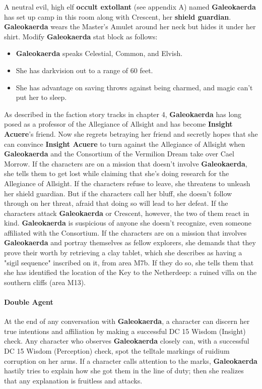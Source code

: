 \documentclass[10pt,a4,twoside,twocolumn,openany,nodeprecatedcode]{dndbook}
\begin{document}
A neutral evil, high elf \textbf{occult extollant} (see appendix A) named \textbf{Galeokaerda} has set up camp in this room along with Crescent, her \textbf{shield guardian}. \textbf{Galeokaerda} wears the Master's Amulet around her neck but hides it under her shirt.
Modify \textbf{Galeokaerda} stat block as follows:
\begin{itemize}

\item \textbf{Galeokaerda} speaks Celestial, Common, and Elvish.
\item She has darkvision out to a range of 60 feet.
\item She has advantage on saving throws against being charmed, and magic can't put her to sleep.
\end{itemize}


As described in the faction story tracks in chapter 4, \textbf{Galeokaerda} has long posed as a professor of the Allegiance of Allsight and has become \textbf{Insight Acuere}'s friend. Now she regrets betraying her friend and secretly hopes that she can convince \textbf{Insight Acuere} to turn against the Allegiance of Allsight when \textbf{Galeokaerda} and the Consortium of the Vermilion Dream take over Cael Morrow.
If the characters are on a mission that doesn't involve \textbf{Galeokaerda}, she tells them to get lost while claiming that she's doing research for the Allegiance of Allsight. If the characters refuse to leave, she threatens to unleash her shield guardian. But if the characters call her bluff, she doesn't follow through on her threat, afraid that doing so will lead to her defeat. If the characters attack \textbf{Galeokaerda} or Crescent, however, the two of them react in kind.
\textbf{Galeokaerda} is suspicious of anyone she doesn't recognize, even someone affiliated with the Consortium. If the characters are on a mission that involves \textbf{Galeokaerda} and portray themselves as fellow explorers, she demands that they prove their worth by retrieving a clay tablet, which she describes as having a "sigil sequence" inscribed on it, from area M7b. If they do so, she tells them that she has identified the location of the Key to the Netherdeep: a ruined villa on the southern cliffs (area M13).
\paragraph{Double Agent}
At the end of any conversation with \textbf{Galeokaerda}, a character can discern her true intentions and affiliation by making a successful DC 15 Wisdom (Insight) check. Any character who observes \textbf{Galeokaerda} closely can, with a successful DC 15 Wisdom (Perception) check, spot the telltale markings of ruidium corruption on her arms. If a character calls attention to the marks, \textbf{Galeokaerda} hastily tries to explain how she got them in the line of duty; then she realizes that any explanation is fruitless and attacks.
\end{document}
